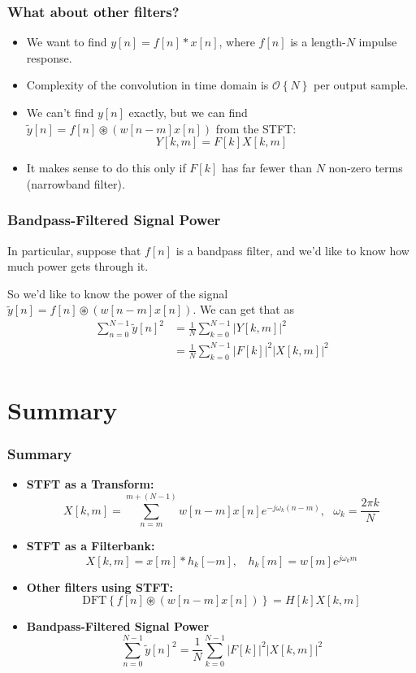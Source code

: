 \documentclass{beamer}
\begin{document}
\begin{frame}
  \frametitle{What about other filters?}

  \begin{itemize}
    \item 
      We want to find $y[n]=f[n]\ast x[n]$, where
      $f[n]$ is a length-$N$ impulse response.
    \item Complexity of the convolution in time domain is
      ${\mathcal{O}}\left\{N\right\}$ per output sample.
    \item We can't find $y[n]$ exactly, but we can find
      $\tilde{y}[n]=f[n]\circledast (w[n-m]x[n])$ from the STFT:
      \[
      Y[k,m] = F[k]X[k,m]
      \]
    \item It makes sense to do this only if $F[k]$ has far fewer than
      $N$ non-zero terms (narrowband filter).
  \end{itemize}
\end{frame}

\begin{frame}
  \frametitle{Bandpass-Filtered Signal Power}

  In particular, suppose that $f[n]$ is a bandpass filter, and we'd
  like to know how much power gets through it.

  So we'd like to know the power of the signal
  $\tilde{y}[n]=f[n]\circledast (w[n-m]x[n])$.  We can get that as
  \begin{align*}
    \sum_{n=0}^{N-1} \tilde{y}[n]^2 
    &= \frac{1}{N}\sum_{k=0}^{N-1} |Y[k,m]|^2\\
    &= \frac{1}{N}\sum_{k=0}^{N-1} |F[k]|^2 |X[k,m]|^2
  \end{align*}
\end{frame}

\section[Summary]{Summary}
\setcounter{subsection}{1}

\begin{frame}
  \frametitle{Summary}
  \begin{itemize}
  \item {\bf STFT as a Transform:}
    \[
    X[k,m]= \sum_{n=m}^{m+(N-1)} w[n-m]x[n]e^{-j\omega_k (n-m)},~~~\omega_k=\frac{2\pi k}{N}
    \]
  \item {\bf STFT as a Filterbank:}
    \[
    X[k,m] = x[m] \ast h_k[-m],~~~~h_k[m] = w[m]e^{j\omega_k m}
    \]
  \item {\bf Other filters using STFT:}
    \[
    \mbox{DFT}\left\{f[n] \circledast (w[n-m]x[n])\right\} = H[k]X[k,m]
    \]
  \item {\bf Bandpass-Filtered Signal Power}
    \[
    \sum_{n=0}^{N-1} \tilde{y}[n]^2 
    = \frac{1}{N}\sum_{k=0}^{N-1} |F[k]|^2 |X[k,m]|^2
    \]
  \end{itemize}
\end{frame}  
\end{document}
